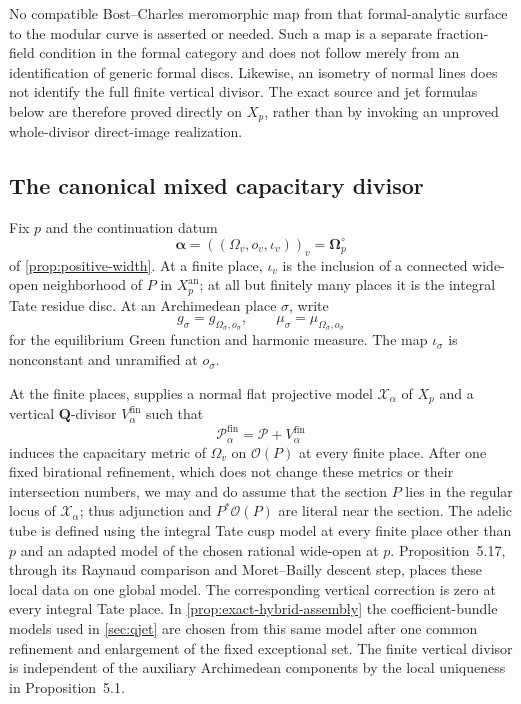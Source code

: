 \documentclass[11pt]{article}
\theoremstyle{definition}
\theoremstyle{remark}
\newcommand{\Q}{\mathbf Q}
\begin{document}
No compatible Bost--Charles meromorphic map from that formal-analytic surface
to the modular curve is asserted or needed.  Such a map is a separate
fraction-field condition in the formal category and does not follow merely
from an identification of generic formal discs.  Likewise, an isometry of
normal lines does not identify the full finite vertical divisor.  The exact
source and jet formulas below are therefore proved directly on $X_p$, rather
than by invoking an unproved whole-divisor direct-image realization.

\subsection{The canonical mixed capacitary divisor}

Fix $p$ and the continuation datum
\[
 \boldsymbol\alpha=
 ((\Omega_v,o_v,\iota_v))_v=\boldsymbol\Omega_p^\circ
\]
of \cref{prop:positive-width}.  At a finite place, $\iota_v$ is the inclusion
of a connected wide-open neighborhood of $P$ in $X_p^{\mathrm{an}}$; at all
but finitely many places it is the integral Tate residue disc.  At an
Archimedean place $\sigma$, write
\[
 g_{\sigma}=g_{\Omega_\sigma,o_\sigma},\qquad
 \mu_\sigma=\mu_{\Omega_\sigma,o_\sigma}
\]
for the equilibrium Green function and harmonic measure.  The map
$\iota_\sigma$ is nonconstant and unramified at $o_\sigma$.

At the finite places, \cite[Propositions~5.1 and~5.17]
{BostChambertLoir2009} supplies a normal flat projective model
$\mathscr X_\alpha$ of $X_p$ and a vertical $\Q$-divisor
$V_\alpha^{\mathrm{fin}}$ such that
\[
 \mathscr P_\alpha^{\mathrm{fin}}
 =\mathscr P+V_\alpha^{\mathrm{fin}}
\]
induces the capacitary metric of $\Omega_v$ on $\mathcal O(P)$ at every finite
place.  After one fixed birational refinement, which does not change these
metrics or their intersection numbers, we may and do assume that the section
$P$ lies in the regular locus of $\mathscr X_\alpha$; thus adjunction and
$P^*\mathcal O(P)$ are literal near the section.  The adelic tube is defined
using the integral Tate cusp model at every
finite place other than $p$ and an adapted model of the chosen rational
wide-open at $p$.  Proposition~5.17, through its Raynaud comparison and
Moret--Bailly descent step, places these local data on one global model.  The
corresponding vertical correction is zero at every integral Tate place.  In
\cref{prop:exact-hybrid-assembly} the coefficient-bundle models used in
\cref{sec:qjet} are chosen from this same model after one common refinement
and enlargement of the fixed exceptional set.  The finite vertical divisor is
independent of the auxiliary Archimedean components by the local uniqueness in
Proposition~5.1.
\end{document}
